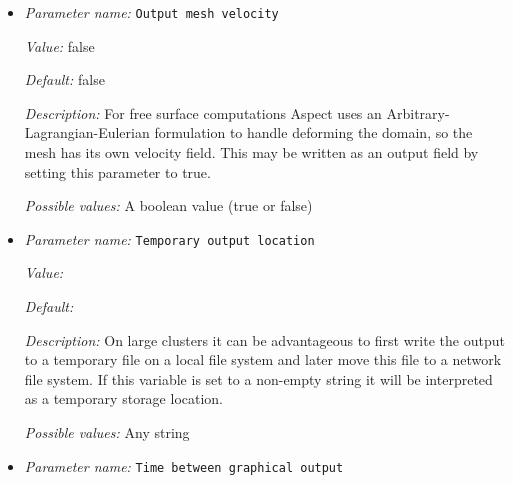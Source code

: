 \begin{itemize}
{\it Value:} vtu


{\it Default:} vtu


{\it Description:} The file format to be used for graphical output. The list of possible output formats that can be given here is documented in the appendix of the manual where the current parameter is described.


{\it Possible values:} Any one of none, dx, ucd, gnuplot, povray, eps, gmv, tecplot, tecplot\_binary, vtk, vtu, hdf5, svg, deal.II intermediate
\item {\it Parameter name:} {\tt Output mesh velocity}
\label{parameters:Postprocess/Visualization/Output mesh velocity}
\label{parameters:Postprocess/Visualization/Output_20mesh_20velocity}


{\it Value:} false


{\it Default:} false


{\it Description:} For free surface computations Aspect uses an Arbitrary-Lagrangian-Eulerian formulation to handle deforming the domain, so the mesh has its own velocity field.  This may be written as an output field by setting this parameter to true.


{\it Possible values:} A boolean value (true or false)
\item {\it Parameter name:} {\tt Temporary output location}
\label{parameters:Postprocess/Visualization/Temporary output location}
\label{parameters:Postprocess/Visualization/Temporary_20output_20location}


{\it Value:} 


{\it Default:} 


{\it Description:} On large clusters it can be advantageous to first write the output to a temporary file on a local file system and later move this file to a network file system. If this variable is set to a non-empty string it will be interpreted as a temporary storage location.


{\it Possible values:} Any string
\item {\it Parameter name:} {\tt Time between graphical output}
\label{parameters:Postprocess/Visualization/Time between graphical output}
\label{parameters:Postprocess/Visualization/Time_20between_20graphical_20output}



\end{itemize}
